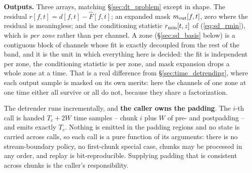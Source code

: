 \documentclass{article}
\numberwithin{equation}{section}   %
\begin{document}
{\bf Outputs.}  Three arrays, matching \S\ref{sec:dt_problem} except in shape.  The residual
$r[f,t] = d[f,t] - \hat F[f,t]$; an expanded mask $m_{\rm out}[f,t]$, zero where the residual is meaningless;
and the conditioning statistic $r_{\rm min}[t,z]$ of (\ref{eq:sd_rmin}), which is {\em per zone} rather than
per channel.  A zone (\S\ref{sec:sd_basis} below) is a contiguous block of channels whose fit is exactly
decoupled from the rest of the band, and it is the unit in which everything here is decided: the fit is
independent per zone, the conditioning statistic is per zone, and mask expansion drops a whole zone at a time.
That is a real difference from \S\ref{sec:time_detrending}, where each output sample is masked on its own
merits: here the channels of one zone at one time either all survive or all do not, because they share a
factorization.

The detrender runs incrementally, and {\bf the caller owns the padding}.  The $i$-th call is handed
$T_c + 2W$ time samples -- chunk $i$ plus $W$ of pre- and postpadding -- and emits exactly $T_c$.  Nothing is
emitted in the padding regions and no state is carried across calls, so each call is a pure function of its
arguments: there is no stream-boundary policy, no first-chunk special case, chunks may be processed in any
order, and replay is bit-reproducible.  Supplying padding that is consistent across chunks is the caller's
responsibility.
\end{document}
